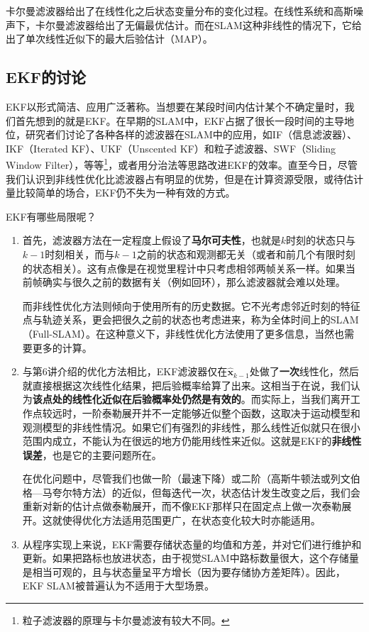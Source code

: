 卡尔曼滤波器给出了在线性化之后状态变量分布的变化过程。在线性系统和高斯噪声下，卡尔曼滤波器给出了无偏最优估计。而在SLAM这种非线性的情况下，它给出了单次线性近似下的最大后验估计（MAP）。

\subsection{EKF的讨论}
EKF以形式简洁、应用广泛著称。当想要在某段时间内估计某个不确定量时，我们首先想到的就是EKF。在早期的SLAM中，EKF占据了很长一段时间的主导地位，研究者们讨论了各种各样的滤波器在SLAM中的应用，如IF（信息滤波器）\textsuperscript{\cite{Sujan2005}}、IKF\textsuperscript{\cite{Janabi-Sharifi2010}}（Iterated KF）、UKF\textsuperscript{\cite{Li2010}}（Unscented KF）和粒子滤波器\textsuperscript{\cite{Sim2007, Lee2011, Gil2010a}}、SWF（Sliding Window \mbox{Filter）\textsuperscript{\cite{Sibley2010}}}，等等\textsuperscript{\cite{Chen2012}}\footnote{粒子滤波器的原理与卡尔曼滤波有较大不同。}，或者用分治法等思路改进EKF的效率\textsuperscript{\cite{Paz2008, Grasa2011}}。直至今日，尽管我们认识到非线性优化比滤波器占有明显的优势，但是在计算资源受限，或待估计量比较简单的场合，EKF仍不失为一种有效的方式。

EKF有哪些局限呢？

\begin{enumerate}
	\item 首先，滤波器方法在一定程度上假设了\textbf{马尔可夫性}，也就是$k$时刻的状态只与$k-1$时刻相关，而与$k-1$之前的状态和观测都无关（或者和前几个有限时刻的状态相关）。这有点像是在视觉里程计中只考虑相邻两帧关系一样。如果当前帧确实与很久之前的数据有关（例如回环），那么滤波器就会难以处理。

	而非线性优化方法则倾向于使用所有的历史数据。它不光考虑邻近时刻的特征点与轨迹关系，更会把很久之前的状态也考虑进来，称为全体时间上的SLAM（Full-SLAM）。在这种意义下，非线性优化方法使用了更多信息，当然也需要更多的计算。
	
	\item 与第6讲介绍的优化方法相比，EKF滤波器仅在$\bm{\hat{x}}_{k-1}$处做了\textbf{一次}线性化，然后就直接根据这次线性化结果，把后验概率给算了出来。这相当于在说，我们认为\textbf{该点处的线性化近似在后验概率处仍然是有效的}。而实际上，当我们离开工作点较远时，一阶泰勒展开并不一定能够近似整个函数，这取决于运动模型和观测模型的非线性情况。如果它们有强烈的非线性，那么线性近似就只在很小范围内成立，不能认为在很远的地方仍能用线性来近似。这就是EKF的\textbf{非线性误差}，也是它的主要问题所在。

	在优化问题中，尽管我们也做一阶（最速下降）或二阶（高斯牛顿法或列文伯格—马夸尔特方法）的近似，但每迭代一次，状态估计发生改变之后，我们会重新对新的估计点做泰勒展开，而不像EKF那样只在固定点上做一次泰勒展开。这就使得优化方法适用范围更广，在状态变化较大时亦能适用。
	
	\item 从程序实现上来说，EKF需要存储状态量的均值和方差，并对它们进行维护和更新。如果把路标也放进状态，由于视觉SLAM中路标数量很大，这个存储量是相当可观的，且与状态量呈平方增长（因为要存储协方差矩阵）。因此，EKF SLAM被普遍认为不适用于大型场景。
\end{enumerate}

